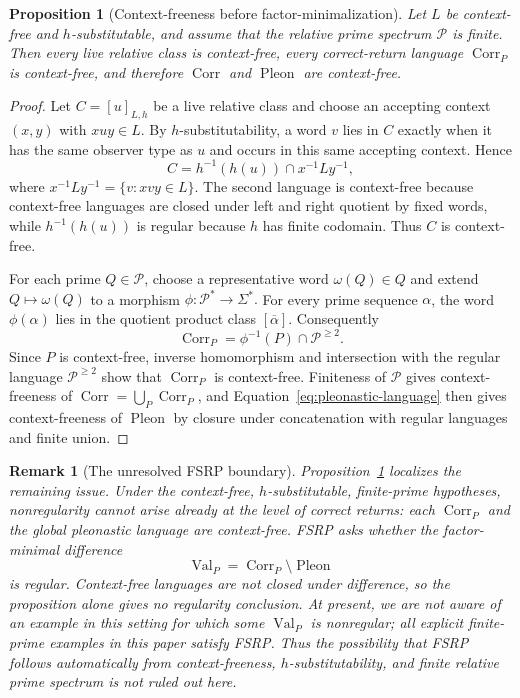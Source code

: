 \documentclass[11pt,a4paper]{article}
\newtheorem{proposition}[theorem]{Proposition}
\newtheorem{remark}[theorem]{Remark}
\newcommand{\Pcal}{\mathcal P}
\newcommand{\Val}{\operatorname{Val}}
\newcommand{\Corr}{\operatorname{Corr}}
\newcommand{\Pleon}{\operatorname{Pleon}}
\begin{document}
\begin{proposition}[Context-freeness before factor-minimalization]
\label{prop:corr-cfl}
Let $L$ be context-free and $h$-substitutable, and assume that the relative prime spectrum $\Pcal$ is finite.  Then every live relative class is context-free, every correct-return language $\Corr_P$ is context-free, and therefore $\Corr$ and $\Pleon$ are context-free.
\end{proposition}

\begin{proof}
Let $C=[u]_{L,h}$ be a live relative class and choose an accepting context $(x,y)$ with $xuy\in L$.  By $h$-substitutability, a word $v$ lies in $C$ exactly when it has the same observer type as $u$ and occurs in this same accepting context.  Hence
\[
  C=h^{-1}(h(u))\cap x^{-1}Ly^{-1},
\]
where $x^{-1}Ly^{-1}=\{v:xvy\in L\}$.  The second language is context-free because context-free languages are closed under left and right quotient by fixed words, while $h^{-1}(h(u))$ is regular because $h$ has finite codomain.  Thus $C$ is context-free.

For each prime $Q\in\Pcal$, choose a representative word $\omega(Q)\in Q$ and extend $Q\mapsto\omega(Q)$ to a morphism
\(\phi:\Pcal^*\to\Sigma^*.\)
For every prime sequence $\alpha$, the word $\phi(\alpha)$ lies in the quotient product class $[\overline\alpha]$.  Consequently
\[
  \Corr_P=\phi^{-1}(P)\cap\Pcal^{\ge2}.
\]
Since $P$ is context-free, inverse homomorphism and intersection with the regular language $\Pcal^{\ge2}$ show that $\Corr_P$ is context-free.  Finiteness of $\Pcal$ gives context-freeness of $\Corr=\bigcup_P\Corr_P$, and Equation~\eqref{eq:pleonastic-language} then gives context-freeness of $\Pleon$ by closure under concatenation with regular languages and finite union.
\end{proof}

\begin{remark}[The unresolved FSRP boundary]
Proposition~\ref{prop:corr-cfl} localizes the remaining issue.  Under the context-free, $h$-substitutable, finite-prime hypotheses, nonregularity cannot arise already at the level of correct returns: each $\Corr_P$ and the global pleonastic language are context-free.  FSRP asks whether the factor-minimal difference
\[
  \Val_P=\Corr_P\setminus\Pleon
\]
is regular.  Context-free languages are not closed under difference, so the proposition alone gives no regularity conclusion.  At present, we are not aware of an example in this setting for which some $\Val_P$ is nonregular; all explicit finite-prime examples in this paper satisfy FSRP.  Thus the possibility that FSRP follows automatically from context-freeness, $h$-substitutability, and finite relative prime spectrum is not ruled out here.
\end{remark}
\end{document}
